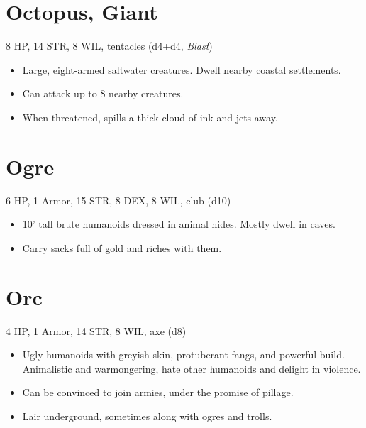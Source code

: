 \documentclass[
  10pt,
  american,
]{article}
\begin{document}
\hypertarget{octopus-giant}{%
\section{Octopus, Giant}\label{octopus-giant}}

8 HP, 14 STR, 8 WIL, tentacles (d4+d4, \emph{Blast})

\begin{samepage}
\begin{itemize}
\setlength\itemsep{-.5em}
\item Large, eight-armed saltwater creatures. Dwell nearby coastal settlements.
\item Can attack up to 8 nearby creatures.
\item When threatened, spills a thick cloud of ink and jets away.
\end{itemize}
\end{samepage}

\hypertarget{ogre}{%
\section{Ogre}\label{ogre}}

6 HP, 1 Armor, 15 STR, 8 DEX, 8 WIL, club (d10)

\begin{samepage}
\begin{itemize}
\setlength\itemsep{-.5em}
\item 10' tall brute humanoids dressed in animal hides. Mostly dwell in caves.
\item Carry sacks full of gold and riches with them.
\end{itemize}
\end{samepage}

\hypertarget{orc}{%
\section{Orc}\label{orc}}

4 HP, 1 Armor, 14 STR, 8 WIL, axe (d8)

\begin{samepage}
\begin{itemize}
\setlength\itemsep{-.5em}
\item Ugly humanoids with greyish skin, protuberant fangs, and powerful build. Animalistic and warmongering, hate other humanoids and delight in violence.
\item Can be convinced to join armies, under the promise of pillage.
\item Lair underground, sometimes along with ogres and trolls.
\end{itemize}
\end{samepage}
\end{document}
